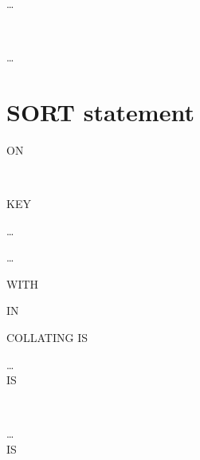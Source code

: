 \begin{1=}
  \begin{1=}
    \conditionname
  \end{1=}\ldots
  \begin{1=}
     \\
  \end{1=}
\end{1=} \ldots

    

\section{SORT statement}

 \identifier
\begin{0-1}
  ON
  \begin{1=}
     \\
  \end{1=}
  KEY
  \begin{0-1}
    \identifier
  \end{0-1}\ldots
\end{0-1} \ldots

\begin{0-1}
  WITH 
  \begin{0-1}
    IN 
  \end{0-1}
\end{0-1}

\begin{0-1}
  COLLATING  IS \identifier
\end{0-1}

\begin{0-1}
  \begin{1=}
    \filename
  \end{1=}\ldots \\

    IS
  \procedurename
  \begin{0-1}
    \begin{1=}
       \\
    \end{1=}
    \procedurename
  \end{0-1}
\end{0-1}

\begin{0-1}
  \begin{1=}
    \filename
  \end{1=}\ldots \\

    IS
  \procedurename
  \begin{0-1}
    \begin{1=}
       \\
    \end{1=}
    \procedurename
  \end{0-1}
\end{0-1}

